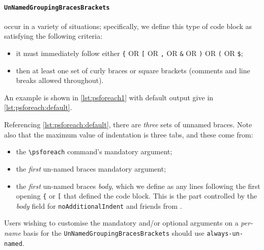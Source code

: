 	\paragraph{\texttt{UnNamedGroupingBracesBrackets}} occur in a variety of situations; specifically, we define
		this type of code block as satisfying the following criteria:
		\begin{itemize}
			\item it must immediately follow either \lstinline!{! OR \lstinline![! OR \lstinline!,! OR \lstinline!&! OR \lstinline!)! OR \lstinline!(!
			      OR \lstinline!$!;
			\item then at least one set of curly braces or square brackets (comments and line breaks allowed throughout).
		\end{itemize}

		An example is shown in \cref{lst:psforeach1} with default output give in \cref{lst:psforeach:default}.

		\begin{minipage}{.45\textwidth}
		\end{minipage}%
		\hfill
		\begin{minipage}{.5\textwidth}
		\end{minipage}%

		Referencing \cref{lst:psforeach:default}, there are \emph{three} sets of unnamed braces. Note also that the maximum value
		of indentation is three tabs, and these come from:
		\begin{itemize}
			\item the \lstinline!\psforeach! command's mandatory argument;
			\item the \emph{first} un-named braces mandatory argument;
			\item the \emph{first} un-named braces \emph{body}, which we define as any lines following the first opening \lstinline!{! or \lstinline![!
			      that defined the code block.  This is the part controlled by the \emph{body} field for \texttt{noAdditionalIndent}
			      and friends from .
		\end{itemize}
		Users wishing to customise the mandatory and/or optional arguments on a \emph{per-name} basis for the \texttt{UnNamedGroupingBracesBrackets}
		should use \texttt{always-un-named}.

